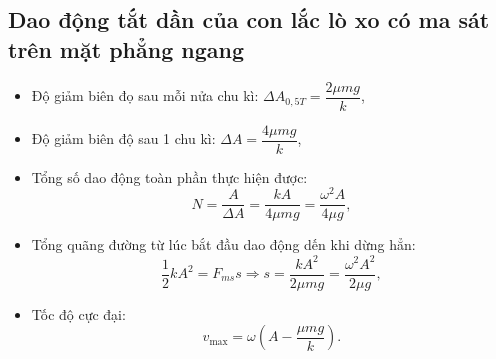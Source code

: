 \subsection{Dao động tắt dần của con lắc lò xo có ma sát trên mặt phẳng ngang}
\begin{itemize}
	\item Độ giảm biên đọ sau mỗi nửa chu kì: $\Delta A_{0,5T}=\dfrac{2\mu mg}{k}$,
	\item Độ giảm biên độ sau 1 chu kì: $\Delta A=\dfrac{4\mu mg}{k}$,
	\item Tổng số dao động toàn phần thực hiện được:
	$$N=\dfrac{A}{\Delta A}=\dfrac{kA}{4\mu mg}=\dfrac{\omega^2A}{4\mu g},$$
	\item Tổng quãng đường từ lúc bắt đầu dao động dến khi dừng hẳn:
	$$\dfrac{1}{2}kA^2=F_{ms}s\Rightarrow s=\dfrac{kA^2}{2\mu mg}=\dfrac{\omega^2A^2}{2\mu g},$$
	\item Tốc độ cực đại:
	$$v_\text{max}=\omega\left(A-\dfrac{\mu mg}{k}\right).$$
\end{itemize}

